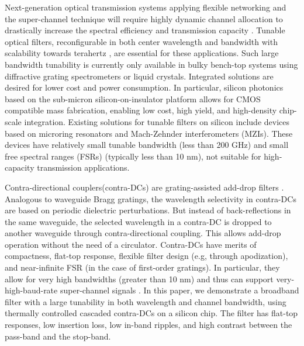\documentclass[osajnl,twocolumn,showpacs,superscriptaddress,10pt]{revtex4-1}
\begin{document}
Next-generation optical transmission systems applying flexible networking and the super-channel technique will require highly dynamic channel allocation to drastically increase the spectral efficiency and transmission capacity \cite{jinno2009spectrum, geisler2011demonstration}.
Tunable optical filters, reconfigurable in both center wavelength and bandwidth with scalability towards terahertz \cite{geisler2011demonstration}, are essential for these applications.
Such large bandwidth tunability is currently only available in bulky bench-top systems using diffractive grating spectrometers or liquid crystals.
Integrated solutions are desired for lower cost and power consumption.
In particular, silicon photonics  based on the sub-micron silicon-on-insulator platform allows for CMOS compatible mass fabrication, enabling low cost, high yield, and high-density chip-scale integration.
Existing solutions for tunable  filters on silicon include devices based on microring resonators \cite{DynamicBW, ong2013ultra} and Mach-Zehnder interferometers (MZIs). These devices have relatively small tunable bandwidth (less than 200 GHz) and small free spectral ranges (FSRs) (typically less than 10 nm), not suitable for high-capacity transmission applications.

Contra-directional couplers(contra-DCs) are grating-assisted add-drop filters \cite{shi2013siliconContraDC}. 
Analogous to waveguide Bragg gratings, the wavelength selectivity in contra-DCs are based on periodic dielectric perturbations. But instead of back-reflections in the same waveguide, the selected wavelength in a contra-DC is dropped to another waveguide through contra-directional coupling.
This allows add-drop operation without the need of a circulator. 
Contra-DCs have merits of compactness, flat-top response, flexible filter design (e.g, through apodization), and near-infinite FSR (in the case of first-order gratings).
In particular, they allow for very high bandwidths (greater than 10 nm) and thus can support very-high-baud-rate super-channel signals \cite{jinno2009spectrum}.
In this paper, we demonstrate a broadband filter with a large tunability in both wavelength and channel bandwidth, using thermally controlled cascaded contra-DCs on a silicon chip. 
The filter has flat-top responses, low insertion loss, low in-band ripples, and high contrast between the pass-band and the stop-band.
\end{document}
